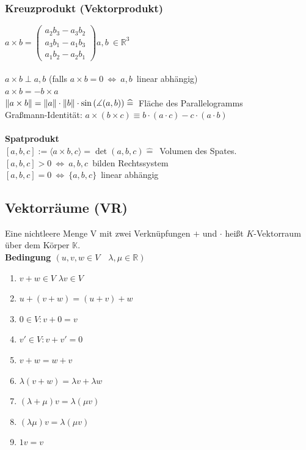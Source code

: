 \documentclass[6pt,a4paper]{scrartcl}
\newcommand{\norm}[2][\relax]{\ifx#1\relax \ensuremath{\left\Vert#2\right\Vert}\else \ensuremath{\left\Vert#2\right\Vert_{#1}}\fi}
\begin{document}
\begin{multicols*}{4}
\subsubsection{Kreuzprodukt (Vektorprodukt)}
$a\times b=\left( \begin{matrix} a_2b_3-a_3b_2\\a_3b_1-a_1b_3\\a_1b_2-a_2b_1\end{matrix}\right)$\qquad $a,b\ \in \mathbb R^3$\\
\\
$a\times b \perp a,b$ \qquad (falls $a\times b=0\ \Leftrightarrow\ a,b$\ linear abhängig)\\
$a \times b = -b \times a$\\
$\norm{a\times b}=\norm{a}\cdot\norm{b}\cdot \sin\left(\measuredangle (a,b)\right)\mathrel{\widehat{=}}$\ Fläche des Parallelogramms\\
Graßmann-Identität: $a\times(b \times c)\equiv b\cdot(a \cdot c)-c\cdot(a \cdot b)$\\
\\
\textbf{Spatprodukt}\\
$[a,b,c]:=\langle  a\times b, c\rangle=\det (a,b,c)\mathrel{\widehat{=}}$\ Volumen des Spates.\\
$[a,b,c]>0\ \Leftrightarrow\ a,b,c$\ bilden Rechtssystem \\ $[a,b,c]=0\ \Leftrightarrow\ \{a,b,c\}$\ linear abhängig

\subsection{Vektorräume (VR)}
Eine nichtleere Menge V mit zwei Verknüpfungen $+$ und $\cdot$ heißt $K$-Vektorraum über dem Körper $\mathbb K$. \\
\textbf{Bedingung $(u,v,w\in V \quad \lambda,\mu \in \mathbb{R})$}
\begin{enumerate}\itemsep0pt
\item $v+w\in V$ \qquad $\lambda v \in V$
\item $u+(v+w)=(u+v)+w$
\item $0\in V: v+0=v$
\item $v'\in V: v+v'=0$
\item $v+w=w+v$
\item $\lambda(v+w)=\lambda v + \lambda w$
\item $(\lambda + \mu)v=\lambda(\mu v)$
\item $(\lambda \mu)v = \lambda(\mu v)$
\item $1v=v$
\end{enumerate}\itemsep0pt

\end{multicols*}
\end{document}
